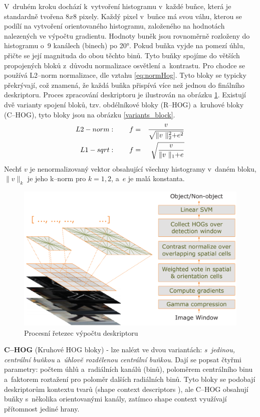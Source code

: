 V~druhém kroku dochází k~vytvoření histogramu v~každé buňce, která je standardně tvořena $8x8$ pixely. Každý pixel v~buňce má svou váhu, kterou se podílí na vytvoření orientovaného histogramu, založeného na hodnotách nalezených ve výpočtu gradientu. Hodnoty buněk jsou rovnoměrně rozloženy do histogramu o~9 kanálech (binech) po \ang{20}. Pokud buňka vyjde na pomezí úhlu, přičte se její magnituda do obou těchto binů.
Tyto buňky spojíme do větších propojených bloků z~důvodu normalizace osvětlení a~kontrastu. Pro chodce se používá L2--norm normalizace, dle vztahu \eqref{eq:normHog}. Tyto bloky se typicky překrývají, což znamená, že každá buňka přispívá více než jednou do finálního deskriptoru. Proces zpracování deskriptoru je ilustrován na obrázku \ref{hog_chain}. Existují dvě varianty spojení bloků, tzv. obdélníkové bloky (R--HOG) a~kruhové bloky (C--HOG), tyto bloky jsou na obrázku \ref{variants_block}.  
\begin{equation}
\centering
 \label{eq:normHog}
 \begin{aligned}
L2-norm&: \qquad  f =& \frac{v}{\sqrt{\lVert v~\lVert_2^2 + e^2}} \\
L1-sqrt&: \qquad  f =& \sqrt{\frac{v}{\lVert v~\lVert_1 + e}}
 \end{aligned}
\end{equation}
Nechť $v$ je nenormalizovaný vektor obsahující všechny histogramy v~daném bloku, $\lVert v \lVert_k$ je jeho k--norm pro $k = 1,2$, a~$e$ je malá konstanta.
 \begin{figure}[H]
\centering
\includegraphics[width=16cm]{figures/hog_pipeline}
\caption{Procesní řetezec výpočtu deskriptoru \cite{hog:dalal}}
\label{hog_chain}
\end{figure}

\textbf{C--HOG} (Kruhové HOG bloky) - lze nalézt ve dvou variantách: \textit{s~jedinou, centrální buňkou} a~\textit{úhlově rozdělenou centrální buňkou}. Dají se popsat čtyřmi parametry: počtem úhlů a~radiálních kanálů (binů), poloměrem centrálního binu a~faktorem roztažení pro poloměr dalších radiálních binů.  Tyto bloky se podobají deskriptorům kontextu tvarů (shape context descriptors \cite{shapeContext}), ale C--HOG obsahují buňky s~několika orientovanými kanály, zatímco shape context využívají přítomnost jediné hrany.

